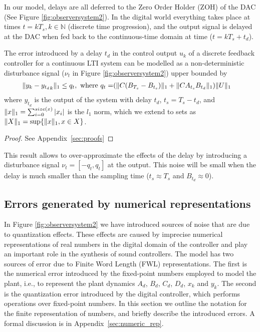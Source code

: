 \documentclass[sigconf]{llncs}
\DeclarePairedDelimiter\norm{\lVert}{\rVert}
\newcommand{\mat}[1]{{#1}}
\renewcommand{\vec}[1]{{#1}}
\begin{document}
In our model, delays are all deferred to the Zero Order Holder (ZOH) of the DAC (See Figure \ref{fig:observersystem2}). 
In the digital world everything takes place at times $t=kT_s, k \in \mathbb{N}$ (discrete time progression),
and the output signal is delayed at the DAC when fed back to the continuous-time domain at time ($t=kT_s+t_d$).

\begin{theorem}
The error introduced by a delay $t_d$ in the control output $\vec{u}_k$ of a discrete feedback controller for a continuous LTI system can be modelled as a non-deterministic disturbance signal ($\nu_t$ in Figure \ref{fig:observersystem2}) upper bounded by 
\begin{align}
\norm{\vec{y}_{k}-{\vec{y}_{t_d}}_{k}}_1 \leq q_t, \text{ where } q_t=&(\norm{\mat{C}(\mat{B}_{T_s}-\mat{B}_{t_s})}_1+\norm{\mat{C}\mat{A}_{t_s}\mat{B}_{t_d}}_1)\norm{U}_1
\end{align}
where $\vec{y}_{t_d}$ is the output of the system with delay $t_d$, $t_s=T_s-t_d$,
and $\norm{\vec{x}}_1=\sum_{i=0}^{size(\vec{x})} |\vec{x}_i|$ is the $l_1$ norm, 
which we extend to sets as $\norm{X}_1 = \sup \{\norm{\vec{x}}_1, \vec{x} \in X\}$.  
\end{theorem}
%
\begin{proof}
See Appendix~\ref{sec:proofs}
\end{proof}
This result allows to over-approximate the effects of the delay by introducing a disturbance signal $\nu_t=[-q_t, q_t]$ at the output.
 This noise will be small when the delay is much smaller than the sampling time ($t_s\approx T_s$ and $\mat{B}_{t_d} \approx 0$).

\subsection{Errors generated by numerical representations} 
\label{sec:numeric_rep2}

In Figure \ref{fig:observersystem2} we have introduced sources of noise that are due to quantization effects.  
These effects are caused by imprecise numerical representations of real numbers in the digital domain of the controller and play an important role in the synthesis of sound controllers. 
The model has two sources of error due to Finite Word Length (FWL) representations. 
The first is the numerical error introduced by the fixed-point numbers employed to model the plant, 
i.e., to represent the plant dynamics $A_d$, $B_d$, $C_d$, $D_d$, $x_k$ and $y_k$. 
The second is the quantization error introduced by the digital controller, 
which performs operations over fixed-point numbers.  
In this section we outline the notation for the finite representation of numbers, 
and briefly describe the introduced errors.  
A formal discussion is in Appendix~\ref{sec:numeric_rep}.
\end{document}
